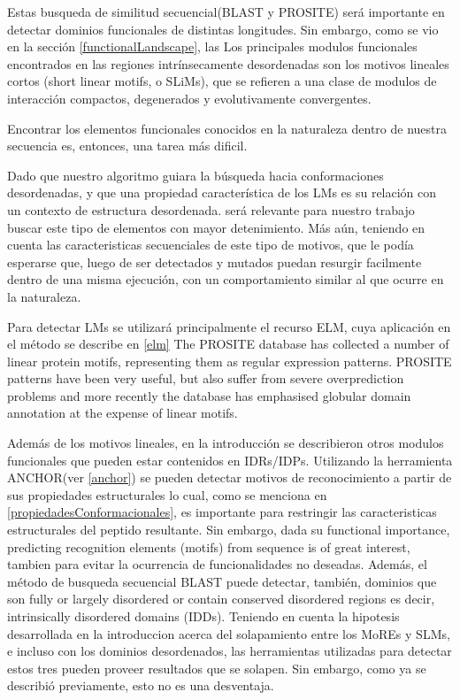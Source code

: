 Estas busqueda de similitud secuencial(BLAST y PROSITE) será importante en detectar dominios funcionales de distintas longitudes. 
Sin embargo, como se vio en la sección \ref{functionalLandscape}, las   
Los principales modulos funcionales encontrados en las regiones intrínsecamente desordenadas son los motivos lineales cortos (short linear motifs, o SLiMs), que se refieren a una clase de modulos de interacción compactos, 
degenerados y evolutivamente convergentes.


Encontrar los elementos funcionales conocidos en la naturaleza dentro de nuestra secuencia es, entonces, una tarea más dificil.
 
Dado que nuestro algoritmo guiara la búsqueda hacia conformaciones desordenadas, y que una propiedad característica de los LMs es su relación con un contexto de estructura desordenada\cite{fuxreiter2007local}.
será relevante para nuestro trabajo buscar este tipo de elementos con mayor detenimiento. Más aún, teniendo en cuenta las caracteristicas secuenciales de este tipo de motivos, que le 
podía esperarse que, luego de ser detectados y mutados puedan resurgir facilmente dentro de una misma ejecución, con un comportamiento similar al que ocurre en la naturaleza.




Para detectar LMs se utilizará principalmente el recurso ELM, cuya aplicación en el método se describe en \ref{elm}
The PROSITE database has collected a number of linear protein motifs, representing them as regular expression patterns. 
PROSITE patterns have been very useful, but also suffer from severe overprediction problems and more recently the database has emphasised globular domain annotation at the expense of linear motifs.




Además de los motivos lineales, en la introducción se describieron otros modulos funcionales que pueden estar contenidos en IDRs/IDPs.
Utilizando la herramienta ANCHOR(ver \ref{anchor}) se pueden detectar motivos de reconocimiento a partir de sus propiedades estructurales lo cual, como se menciona en \ref{propiedadesConformacionales}, es importante para restringir las 
caracteristicas estructurales del peptido resultante. Sin embargo, dada su functional importance, predicting recognition elements (motifs) from sequence is of great interest, tambien para evitar la ocurrencia de funcionalidades no deseadas.
Además, el método de busqueda secuencial BLAST puede detectar, también, dominios que son fully or largely disordered or contain conserved disordered regions es decir, intrinsically disordered domains (IDDs).
Teniendo en cuenta la hipotesis desarrollada en la introduccion acerca del solapamiento entre los MoREs y SLMs, e incluso con los dominios desordenados, las herramientas utilizadas para detectar estos tres pueden proveer resultados que se solapen.
Sin embargo, como ya se describió previamente, esto no es una desventaja.

